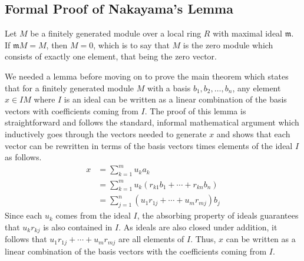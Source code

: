 \documentclass{article}
\begin{document}
\subsection{Formal Proof of Nakayama's Lemma}


\begin{theorem}
  Let \(M\) be a finitely generated module over a local ring \(R\) with maximal
  ideal \(\mathfrak{m}\). If \(\mathfrak{m} M = M\), then \(M = 0\), which is
  to say that \(M\) is the zero module which consists of exactly one element,
  that being the zero vector.
\end{theorem}

We needed a lemma before moving on to prove the main theorem which states that
for a finitely generated module \(M\) with a basis
\(b_{1}, b_{2}, \dots, b_{n}\), any element \(x\in I M\) where \(I\) is an
ideal can be written as a linear combination of the basis vectors with
coefficients coming from \(I\). The proof of this lemma is straightforward and
follows the standard, informal mathematical argument which inductively goes
through the vectors needed to generate \(x\) and shows that each vector can be
rewritten in terms of the basis vectors times elements of the ideal \(I\) as
follows.
\begin{align*}
  x & = \sum_{k=1}^{m} u_{k} a_{k} \\
    & = \sum_{k=1}^{m} u_{k} (r_{k1} b_{1} + \cdots + r_{kn} b_{n}) \\
    & = \sum_{j=1}^{n} (u_{1} r_{1j} + \cdots + u_{m} r_{mj}) b_{j}
\end{align*}
Since each \(u_{k}\) comes from the ideal \(I\), the absorbing property of
ideals guarantees that \(u_{k} r_{k j}\) is also contained in \(I\). As ideals
are also closed under addition, it follows that \(u_{1} r_{1j} + \cdots +
u_{m} r_{m j}\) are all elements of \(I\). Thus, \(x\) can be written as a
linear combination of the basis vectors with the coefficients coming from
\(I\).
\end{document}
